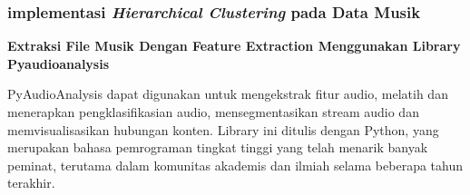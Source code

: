 \subsubsection{implementasi \textit{Hierarchical Clustering} pada Data Musik}

\par\textbf{Extraksi File Musik Dengan Feature Extraction Menggunakan Library Pyaudioanalysis}

\par\hspace{0.5cm}PyAudioAnalysis dapat digunakan untuk mengekstrak fitur audio, melatih dan menerapkan pengklasifikasian audio, mensegmentasikan stream audio dan memvisualisasikan hubungan konten. Library  ini ditulis dengan Python, yang merupakan bahasa pemrograman tingkat tinggi yang telah menarik banyak peminat, terutama dalam komunitas akademis dan ilmiah selama beberapa tahun terakhir.\citep*{giannakopoulos2015pyaudioanalysis}  



